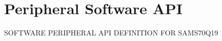\hypertarget{group__SAMS70Q19__api}{}\section{Peripheral Software A\+PI}
\label{group__SAMS70Q19__api}
S\+O\+F\+T\+W\+A\+RE P\+E\+R\+I\+P\+H\+E\+R\+AL A\+PI D\+E\+F\+I\+N\+I\+T\+I\+ON F\+OR S\+A\+M\+S70\+Q19 